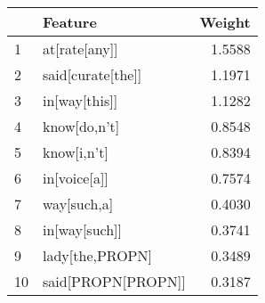 \begin{tabular}{llr}
\toprule
{} &             Feature &  Weight \\
\midrule
1  &       at[rate[any]] &  1.5588 \\
2  &   said[curate[the]] &  1.1971 \\
3  &       in[way[this]] &  1.1282 \\
4  &        know[do,n't] &  0.8548 \\
5  &         know[i,n't] &  0.8394 \\
6  &        in[voice[a]] &  0.7574 \\
7  &         way[such,a] &  0.4030 \\
8  &       in[way[such]] &  0.3741 \\
9  &     lady[the,PROPN] &  0.3489 \\
10 &  said[PROPN[PROPN]] &  0.3187 \\
\bottomrule
\end{tabular}
